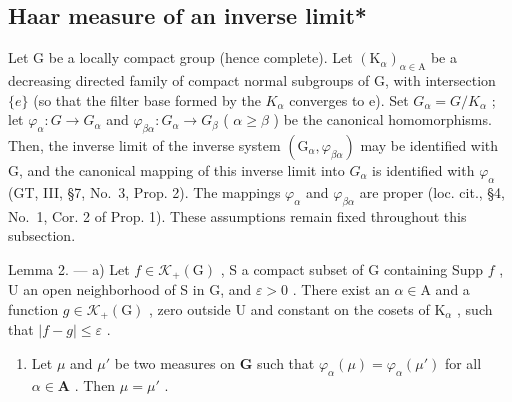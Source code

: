 \subsection{Haar measure of an inverse limit*}

Let G be a locally compact group (hence complete). Let \((\mathrm{K}_{\alpha})_{\alpha\in\mathrm{A}}\) be a decreasing directed family of compact normal subgroups of G, with intersection \(\{e\}\) (so that the filter base formed by the \(K_{\alpha}\) converges to e). Set \(G_{\alpha}=G/K_{\alpha}\) ; let \(\varphi_{\alpha}:G\to G_{\alpha}\) and \(\varphi_{\beta\alpha}:G_{\alpha}\to G_{\beta}\) ( \(\alpha\geqslant\beta\) ) be the canonical homomorphisms. Then, the inverse limit of the inverse system \((\mathrm{G}_{\alpha},\varphi_{\beta\alpha})\) may be identified with G, and the canonical mapping of this inverse limit into \(G_{\alpha}\) is identified with \(\varphi_{\alpha}\) (GT, III, §7, No.~3, Prop. 2). The mappings \(\varphi_{\alpha}\) and \(\varphi_{\beta\alpha}\) are proper (loc. cit., §4, No.~1, Cor. 2 of Prop. 1). These assumptions remain fixed throughout this subsection.

Lemma 2. --- a) Let \(f \in \mathcal{K}_{+}(\mathrm{G})\) , S a compact subset of G containing Supp \(f\) , U an open neighborhood of S in G, and \(\varepsilon > 0\) . There exist an \(\alpha \in \mathrm{A}\) and a function \(g \in \mathcal{K}_{+}(\mathrm{G})\) , zero outside U and constant on the cosets of \(\mathrm{K}_{\alpha}\) , such that \(|f - g| \leqslant \varepsilon\) .

\begin{enumerate}
\def\labelenumi{\alph{enumi})}
\setcounter{enumi}{1}
\tightlist
\item
  Let \(\mu\) and \(\mu'\) be two measures on \(\mathbf{G}\) such that \(\varphi_{\alpha}(\mu) = \varphi_{\alpha}(\mu')\) for all \(\alpha \in \mathbf{A}\) . Then \(\mu = \mu'\) .
\end{enumerate}


